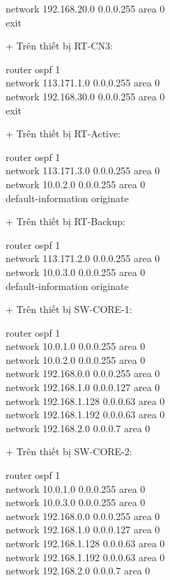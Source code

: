 \documentclass[12pt, a4paper]{article}
\begin{document}
\begin{flushleft}
\begin{tcolorbox}
			network 192.168.20.0 0.0.0.255 area 0\\
			exit
		\end{tcolorbox}
		+ Trên thiết bị RT-CN3: 
		\begin{tcolorbox}
			router ospf 1\\
			network 113.171.1.0 0.0.0.255 area 0\\
			network 192.168.30.0 0.0.0.255 area 0\\
			exit
		\end{tcolorbox}
		+ Trên thiết bị RT-Active: 
		\begin{tcolorbox}
			router ospf 1\\
			network 113.171.3.0 0.0.0.255 area 0\\
			network 10.0.2.0 0.0.0.255 area 0 \\
			default-information originate
		\end{tcolorbox}
		\newpage
		+ Trên thiết bị RT-Backup: 
		\begin{tcolorbox}
			router ospf 1\\
			network 113.171.2.0 0.0.0.255 area 0\\
			network 10.0.3.0 0.0.0.255 area 0\\
			default-information originate
		\end{tcolorbox}
		+ Trên thiết bị SW-CORE-1: 
		\begin{tcolorbox}
			\setstretch{1.45}
			router ospf 1\\
			network 10.0.1.0 0.0.0.255 area 0\\
			network 10.0.2.0 0.0.0.255 area 0\\
			network 192.168.0.0 0.0.0.255 area 0\\
			network 192.168.1.0 0.0.0.127 area 0\\
			network 192.168.1.128 0.0.0.63 area 0\\
			network 192.168.1.192 0.0.0.63 area 0\\
			network 192.168.2.0 0.0.0.7 area 0
		\end{tcolorbox}
		+ Trên thiết bị SW-CORE-2: 
		\begin{tcolorbox}
			router ospf 1\\
			network 10.0.1.0 0.0.0.255 area 0\\
			network 10.0.3.0 0.0.0.255 area 0\\
			network 192.168.0.0 0.0.0.255 area 0\\
			network 192.168.1.0 0.0.0.127 area 0\\
			network 192.168.1.128 0.0.0.63 area 0\\
			network 192.168.1.192 0.0.0.63 area 0\\
			network 192.168.2.0 0.0.0.7 area 0
		\end{tcolorbox}
	\end{flushleft}
	
\end{document}
